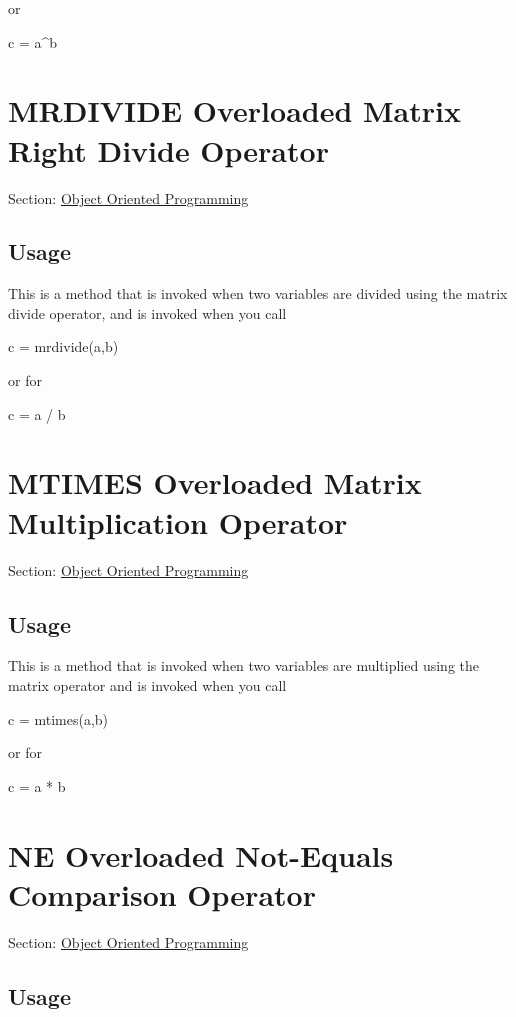  or \begin{DoxyVerb}  c = a^b
\end{DoxyVerb}
 \hypertarget{class_mrdivide}{}\section{M\-R\-D\-I\-V\-I\-D\-E Overloaded Matrix Right Divide Operator}\label{class_mrdivide}
Section\-: \hyperlink{sec_class}{Object Oriented Programming} \hypertarget{vtkwidgets_vtkxyplotwidget_Usage}{}\subsection{Usage}\label{vtkwidgets_vtkxyplotwidget_Usage}
This is a method that is invoked when two variables are divided using the matrix divide operator, and is invoked when you call \begin{DoxyVerb}   c = mrdivide(a,b)
\end{DoxyVerb}
 or for \begin{DoxyVerb}   c = a / b
\end{DoxyVerb}
 \hypertarget{class_mtimes}{}\section{M\-T\-I\-M\-E\-S Overloaded Matrix Multiplication Operator}\label{class_mtimes}
Section\-: \hyperlink{sec_class}{Object Oriented Programming} \hypertarget{vtkwidgets_vtkxyplotwidget_Usage}{}\subsection{Usage}\label{vtkwidgets_vtkxyplotwidget_Usage}
This is a method that is invoked when two variables are multiplied using the matrix operator and is invoked when you call \begin{DoxyVerb}   c = mtimes(a,b)
\end{DoxyVerb}
 or for \begin{DoxyVerb}   c = a * b
\end{DoxyVerb}
 \hypertarget{class_ne}{}\section{N\-E Overloaded Not-\/\-Equals Comparison Operator}\label{class_ne}
Section\-: \hyperlink{sec_class}{Object Oriented Programming} \hypertarget{vtkwidgets_vtkxyplotwidget_Usage}{}\subsection{Usage}\label{vtkwidgets_vtkxyplotwidget_Usage}
